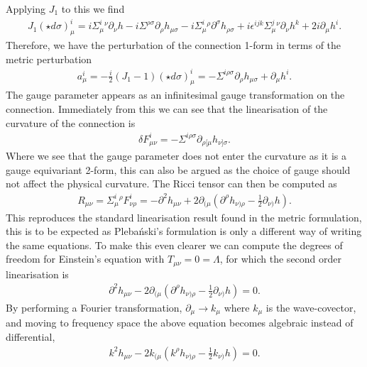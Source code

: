 \documentclass[10pt]{report}
\newcommand{\pleb}[0]{Pleba\'nski}
\theoremstyle{definition}
\begin{document}
Applying $J_1$ to this we find 
\begin{align}
    J_1(\star d \sigma)^i_\mu = i \Sigma^i_\mu{}^\nu \partial_\nu h - i \Sigma^{\rho\sigma} \partial_\rho h_{\mu\sigma} - i \Sigma^i_\mu{}^\rho \partial^\sigma h_{\rho\sigma} + i \epsilon^{ijk} \Sigma^j_\mu{}^\nu \partial_\nu h^k + 2i\partial_\mu h^i.
\end{align}
Therefore, we have the perturbation of the connection 1-form in terms of the metric perturbation
\begin{align}
    a^i_\mu = -\frac{i}{2} \left( J_1 - 1 \right)(\star d \sigma)^i_\mu = - \Sigma^{i\rho\sigma} \partial_\rho h_{\mu\sigma} + \partial_\mu h^i. \label{eq:lin-connection-perturbation-in-h}
\end{align}
The gauge parameter appears as an infinitesimal gauge transformation on the connection. Immediately from this we can see that the linearisation of the curvature of the connection is 
\begin{align}
    \delta F^i_{\mu\nu} = - \Sigma^{i\rho\sigma} \partial_{\rho[\mu} h_{\nu]\sigma}.
\end{align}
Where we see that the gauge parameter does not enter the curvature as it is a gauge equivariant 2-form, this can also be argued as the choice of gauge should not affect the physical curvature. The Ricci tensor can then be computed as 
\begin{align}
    R_{\mu\nu} = \Sigma^i_\mu{}^\rho F^i_{\nu\rho} = -\partial^2 h_{\mu\nu} + 2 \partial_{(\mu} \left( \partial^\rho h_{\nu)\rho} - \frac{1}{2} \partial_{\nu)} h \right).
\end{align}
This reproduces the standard linearisation result found in the metric formulation, this is to be expected as \pleb{}'s formulation is only a different way of writing the same equations. To make this even clearer we can compute the degrees of freedom for Einstein's equation with $T_{\mu\nu} = 0 = \Lambda$, for which the second order linearisation is 
\begin{align}
    \partial^2 h_{\mu\nu} - 2 \partial_{(\mu} \left( \partial^\rho h_{\nu)\rho} - \frac{1}{2} \partial_{\nu)} h \right) = 0.
\end{align}
By performing a Fourier transformation, $\partial_\mu \rightarrow k_\mu$ where $k_\mu$ is the wave-covector, and moving to frequency space the above equation becomes algebraic instead of differential,
\begin{align}
    k^2 h_{\mu\nu} - 2 k_{(\mu} \left( k^\rho h_{\nu)\rho} - \frac{1}{2} k_{\nu)} h \right) = 0.
\end{align}
\end{document}
